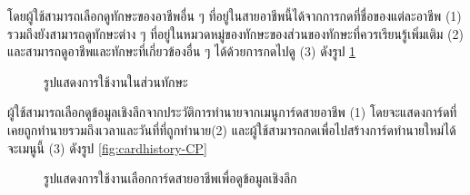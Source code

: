 โดยผู้ใช้สามารถเลือกดูทักษะของอาชีพอื่น ๆ ที่อยู่ในสายอาชีพนี้ได้จากการกดที่ชื่อของแต่ละอาชีพ (1) รวมถึงยังสามารถดูทักษะต่าง ๆ ที่อยู่ในหมวดหมู่ของทักษะของส่วนของทักษะที่ควรเรียนรู้เพิ่มเติม (2) และสามารถดูอาชีพและทักษะที่เกี่ยวข้องอื่น ๆ ได้ด้วยการกดไปดู (3) ดังรูป \ref{fig:skillaction-CI}
\begin{figure}[H]\centering
    \caption{รูปแสดงการใช้งานในส่วนทักษะ}\label{fig:skillaction-CI}
\end{figure}
ผู้ใช้สามารถเลือกดูข้อมูลเชิงลึกจากประวัติการทำนายจากเมนูการ์ดสายอาชีพ (1) โดยจะแสดงการ์ดที่เคยถูกทำนายรวมถึงเวลาและวันที่ที่ถูกทำนาย(2) และผู้ใช้สามารถกดเพื่อไปสร้างการ์ดทำนายใหม่ได้จะเมนูนี้ (3) ดังรูป \ref{fig:cardhistory-CP}
\begin{figure}[H]\centering
    \caption{รูปแสดงการใช้งานเลือกการ์ดสายอาชีพเพื่อดูข้อมูลเชิงลึก}\label{fig:cardhistory-CI}
\end{figure}

